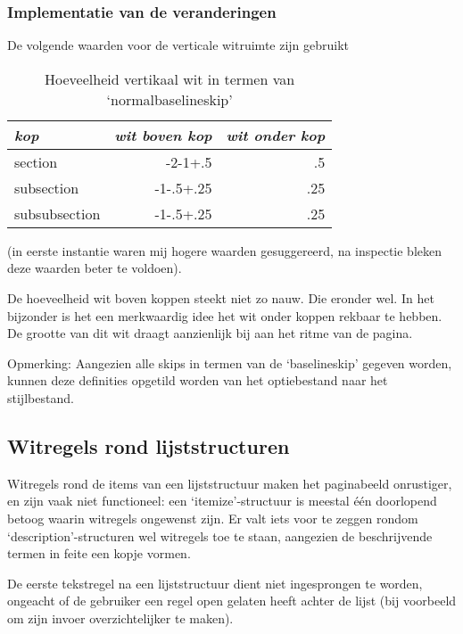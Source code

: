 \documentclass[oldtoc,a4paper,10pt]{rapport3}
\begin{document}
\subsubsection{Implementatie van de veranderingen}
De volgende waarden voor de verticale witruimte zijn gebruikt
\begin{table}[h]
  \begin{center}
    \begin{tabular}{|l|r|r|}
      \hline
      \emph{kop}    & \emph{wit boven kop}&\emph{wit onder kop}\\
      \hline
      section      & -2-1+.5   & .5\\
      subsection   & -1-.5+.25 & .25\\
      subsubsection& -1-.5+.25 & .25\\
      \hline
    \end{tabular}
  \end{center}
 \caption{Hoeveelheid vertikaal wit in termen van
   `normalbaselineskip'}
\end{table}
(in eerste instantie waren mij hogere waarden gesuggereerd, na
inspectie bleken deze waarden beter te voldoen).
 
De hoeveelheid wit boven koppen steekt niet zo nauw.  Die eronder wel.
In het bijzonder is het een merkwaardig idee het wit onder koppen
rekbaar te hebben.  De grootte van dit wit draagt aanzienlijk bij aan
het ritme van de pagina.
 
 
 
\noindent Opmerking: Aangezien alle skips in termen van de
`baselineskip' gegeven worden, kunnen deze definities opgetild worden
van het optiebestand naar het stijlbestand.
 
 
\subsection{Witregels rond lijststructuren}
 
Witregels rond de items van een lijststructuur maken het paginabeeld
onrustiger, en zijn vaak niet functioneel: een `itemize'-structuur is
meestal \'e\'en doorlopend betoog waarin witregels ongewenst zijn.  Er
valt iets voor te zeggen rondom `description'-structuren wel witregels
toe te staan, aangezien de beschrijvende termen in feite een kopje
vormen.
 
De eerste tekstregel na een lijststructuur dient niet ingesprongen te
worden, ongeacht of de gebruiker een regel open gelaten heeft achter
de lijst (bij voorbeeld om zijn invoer overzichtelijker te maken).
 
\end{document}
